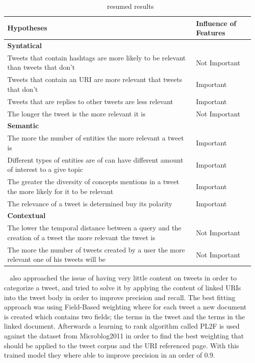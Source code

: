\begin{table}[tb]
  \caption{~\citet{Tao2012} resumed results}
  \label{tab:tao_table}
  \begin{tabularx}{\textwidth}{|X|l|}
  \hline
  \textbf{Hypotheses} & \textbf{Influence of Features} \\
  \hline
  \hline

  {\bf Syntatical} &  \\
  \hline
  Tweets that contain hashtags are more likely to be relevant than tweets that don't & Not Important \\
  \hline
  Tweets that contain an URI are more relevant that tweets that don't  &Important \\
  \hline
  Tweets that are replies to other tweets are less relevant & Important \\
  \hline
  The longer the tweet is the more relevant it is & Not Important\\
  \hline
  \hline

  {\bf Semantic}  &  \\
  \hline
  
  The more the number of entities the more relevant a tweet is  & Important \\
  \hline
  Different types of entities are of can have different amount of interest to a give topic  & Important \\
  \hline
  The greater the diversity of concepts mentions in a tweet the more likely for it to be relevant & Important \\
  \hline
  The relevance of a tweet is determined buy its polarity & Important \\
  \hline
  \hline

  {\bf Contextual} &  \\
  \hline
  The lower the temporal distance between a query and the creation of a tweet the more relevant the tweet is  & Not Important \\
  \hline
  The more the number of tweets created by a user the more relevant one of his tweets will be & Not Important \\
  \hline
  \end{tabularx}
\end{table}

~\citet{McCreadie2013} also approached the issue of having very little content on tweets in order to categorize a tweet, and tried to solve it by applying the content of linked URIs into the tweet body in order to improve precision and recall. The best fitting approach was using Field-Based weighting where for each tweet a new document is created which contains two fields; the terms in the tweet and the terms in the linked document. 
Afterwards a learning to rank algorithm called PL2F is used against the dataset from Microblog2011 in order to find the best weighting that should be applied to the tweet corpus and the URI referenced page. 
With this trained model they where able to improve precision in an order of 0.9. 

